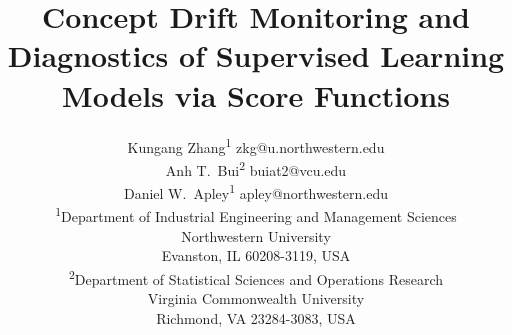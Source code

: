 \documentclass[twoside,11pt]{article}
\begin{document}
\title{Concept Drift Monitoring and Diagnostics of Supervised Learning Models via Score Functions}

\author{\name Kungang Zhang\textsuperscript{1} \email zkg@u.northwestern.edu \\
	\name Anh T.\ Bui\textsuperscript{2} \email buiat2@vcu.edu \\
	\name Daniel W.\ Apley\textsuperscript{1} \email apley@northwestern.edu \\
       \addr \textsuperscript{1}Department of Industrial Engineering and Management Sciences\\
       Northwestern University\\
       Evanston, IL 60208-3119, USA\\
       \textsuperscript{2}Department of Statistical Sciences and Operations Research\\ 
       Virginia Commonwealth University\\
       Richmond, VA 23284-3083, USA}

\maketitle
\end{document}
